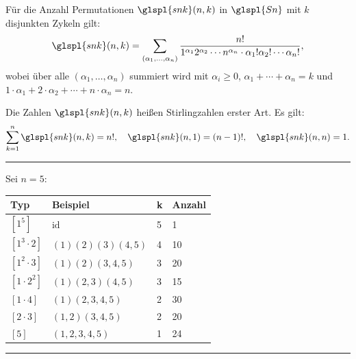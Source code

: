 \documentclass[9pt]{article}
\begin{document}
\begin{satz}
Für die Anzahl Permutationen $\glspl{snk}(n, k)$ in $\glspl{Sn}$  mit $k$ disjunkten Zykeln gilt:
\[
\glspl{snk}(n, k) = \sum_{(\alpha_1, \dots, \alpha_n)} \frac{n!}{1^{\alpha_1} 2^{\alpha_2} \cdots n^{\alpha_n} \cdot \alpha_1! \alpha_2! \cdots \alpha_n!},
\]
wobei über alle $(\alpha_1, \dots, \alpha_n)$ summiert wird mit $\alpha_i \geq 0$, $\alpha_1 + \cdots + \alpha_n = k$ und $1 \cdot \alpha_1 + 2 \cdot \alpha_2 + \cdots + n \cdot \alpha_n = n$.

Die Zahlen $\glspl{snk}(n, k)$ heißen Stirlingzahlen erster Art. Es gilt:
\[
\sum_{k=1}^n \glspl{snk}(n, k) = n!, \quad \glspl{snk}(n, 1) = (n-1)!, \quad \glspl{snk}(n, n) = 1.
\]
 \end{satz} \noindent \rule{8cm}{0.4pt}

\begin{bsp}
Sei $n = 5$:
\begin{table}[h!]
\centering
\begin{tabular}{|l|l|l|l|}
\hline
\textbf{Typ} & \textbf{Beispiel} & \textbf{k} & \textbf{Anzahl} \\
\hline
$[1^5]$ & $\mathrm{id}$ & 5 & 1 \\
$[1^3 \cdot 2]$ & $(1)(2)(3)(4,5)$ & 4 & 10 \\
$[1^2 \cdot 3]$ & $(1)(2)(3,4,5)$ & 3 & 20 \\
$[1 \cdot 2^2]$ & $(1)(2,3)(4,5)$ & 3 & 15 \\
$[1 \cdot 4]$ & $(1)(2,3,4,5)$ & 2 & 30 \\
$[2 \cdot 3]$ & $(1,2)(3,4,5)$ & 2 & 20 \\
$[5]$ & $(1,2,3,4,5)$ & 1 & 24 \\
\hline
\end{tabular}
\end{table}
\end{bsp} \noindent \rule{8cm}{0.4pt}
\end{document}
